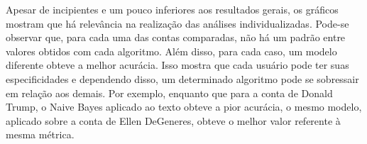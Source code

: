 \documentclass[oneside,openright,12pt]{ufsm_2015} %
\begin{document}
    \par Apesar de incipientes e um pouco inferiores aos resultados gerais, os gráficos mostram que há relevância na realização das análises individualizadas. Pode-se observar que, para cada uma das contas comparadas, não há um padrão entre valores obtidos com cada algoritmo. Além disso, para cada caso, um modelo diferente obteve a melhor acurácia. Isso mostra que cada usuário pode ter suas especificidades e dependendo disso, um determinado algoritmo pode se sobressair em relação aos demais. Por exemplo, enquanto que para a conta de Donald Trump, o Naive Bayes aplicado ao texto obteve a pior acurácia, o mesmo modelo, aplicado sobre a conta de Ellen DeGeneres, obteve o melhor valor referente à mesma métrica.
    
    \mydata
    
\end{document}
